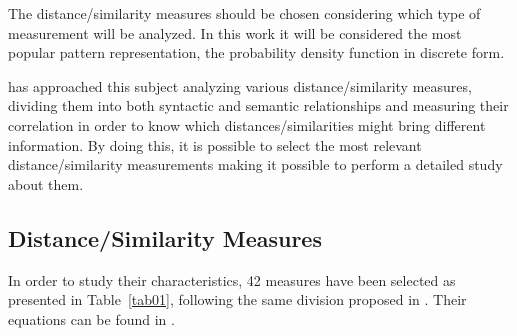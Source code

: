\documentclass[conference]{IEEEtran}
\begin{document}
The distance/similarity measures should be chosen considering which type of measurement will be analyzed. In this work it will be considered the most popular pattern representation, the probability density function in discrete form.

\cite{cha2007comprehensive} has approached this subject analyzing various distance/similarity measures, dividing them into both syntactic and semantic relationships and measuring their correlation in order to know which distances/similarities might bring different information. By doing this, it is possible to select the most relevant distance/similarity measurements making it possible to perform a detailed study about them.

\subsection{Distance/Similarity Measures}

In order to study their characteristics, 42 measures have been selected as presented in Table~\ref{tab01}, following the same division proposed in \cite{cha2007comprehensive}. Their equations can be found in \cite{deza2009encyclopedia}.
\end{document}
